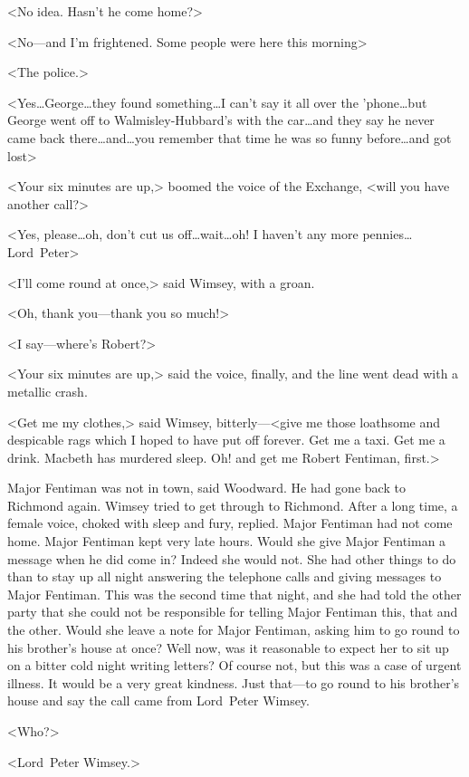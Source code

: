 <No idea. Hasn't he come home?>

<No—and I'm frightened. Some people were here this morning\longdots>

<The police.>

<Yes\dots  George\dots  they found something\dots  I can't say it all over the 'phone\dots  but George went off to Walmisley-Hubbard's with the car\dots  and they say he never came back there\dots  and\dots  you remember that time he was so funny before\dots  and got lost\longdots>

<Your six minutes are up,> boomed the voice of the Exchange, <will you have another call?>

<Yes, please\dots  oh, don't cut us off\dots  wait\dots  oh! I haven't any more pennies\dots  Lord~Peter\longdots>

<I'll come round at once,> said Wimsey, with a groan.

<Oh, thank you—thank you so much!>

<I say—where's Robert?>

<Your six minutes are up,> said the voice, finally, and the line went dead with a metallic crash.

<Get me my clothes,> said Wimsey, bitterly—<give me those loathsome and despicable rags which I hoped to have put off forever. Get me a taxi. Get me a drink. Macbeth has murdered sleep. Oh! and get me Robert Fentiman, first.>

Major Fentiman was not in town, said Woodward. He had gone back to Richmond again. Wimsey tried to get through to Richmond. After a long time, a female voice, choked with sleep and fury, replied. Major Fentiman had not come home. Major Fentiman kept very late hours. Would she give Major Fentiman a message when he did come in? Indeed she would not. She had other things to do than to stay up all night answering the telephone calls and giving messages to Major Fentiman. This was the second time that night, and she had told the other party that she could not be responsible for telling Major Fentiman this, that and the other. Would she leave a note for Major Fentiman, asking him to go round to his brother's house at once? Well now, was it reasonable to expect her to sit up on a bitter cold night writing letters? Of course not, but this was a case of urgent illness. It would be a very great kindness. Just that—to go round to his brother's house and say the call came from Lord~Peter Wimsey.

<Who?>

<Lord~Peter Wimsey.>

